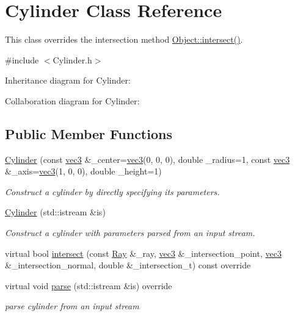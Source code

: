 \hypertarget{classCylinder}{}\section{Cylinder Class Reference}
\label{classCylinder}


This class overrides the intersection method \hyperlink{structObject_ac6549d30793a9b3da070234bf10c7e91}{Object\+::intersect()}.  




{\ttfamily \#include $<$Cylinder.\+h$>$}



Inheritance diagram for Cylinder\+:


Collaboration diagram for Cylinder\+:
\subsection*{Public Member Functions}
\begin{DoxyCompactItemize}
\item 
\hyperlink{classCylinder_acfd8665ca7813f66b02db296fa0a6fd3}{Cylinder} (const \hyperlink{classvec3}{vec3} \&\+\_\+center=\hyperlink{classvec3}{vec3}(0, 0, 0), double \+\_\+radius=1, const \hyperlink{classvec3}{vec3} \&\+\_\+axis=\hyperlink{classvec3}{vec3}(1, 0, 0), double \+\_\+height=1)
\begin{DoxyCompactList}\small\item\em Construct a cylinder by directly specifying its parameters. \end{DoxyCompactList}\item 
\hyperlink{classCylinder_a63a01bb5b2a520b0fb7521740a90c2a7}{Cylinder} (std\+::istream \&is)
\begin{DoxyCompactList}\small\item\em Construct a cylinder with parameters parsed from an input stream. \end{DoxyCompactList}\item 
virtual bool \hyperlink{classCylinder_a0ae732b1b669bbeb9eb83ee7395a5add}{intersect} (const \hyperlink{classRay}{Ray} \&\+\_\+ray, \hyperlink{classvec3}{vec3} \&\+\_\+intersection\+\_\+point, \hyperlink{classvec3}{vec3} \&\+\_\+intersection\+\_\+normal, double \&\+\_\+intersection\+\_\+t) const override
\item 
virtual void \hyperlink{classCylinder_a15050a6257a624cae1566a949b03b7da}{parse} (std\+::istream \&is) override
\begin{DoxyCompactList}\small\item\em parse cylinder from an input stream \end{DoxyCompactList}\end{DoxyCompactItemize}
